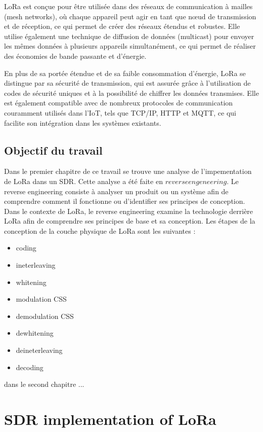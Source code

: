 \documentclass[12pt,a4paper,oneside, titlepage]{report}
\begin{document}
LoRa est conçue pour être utilisée dans des réseaux de communication à mailles (mesh networks), où chaque appareil peut agir en tant que nœud de transmission et de réception, ce qui permet de créer des réseaux étendus et robustes. Elle utilise également une technique de diffusion de données (multicast) pour envoyer les mêmes données à plusieurs appareils simultanément, ce qui permet de réaliser des économies de bande passante et d'énergie.

En plus de sa portée étendue et de sa faible consommation d'énergie, LoRa se distingue par sa sécurité de transmission, qui est assurée grâce à l'utilisation de codes de sécurité uniques et à la possibilité de chiffrer les données transmises. Elle est également compatible avec de nombreux protocoles de communication couramment utilisés dans l'IoT, tels que TCP/IP, HTTP et MQTT, ce qui facilite son intégration dans les systèmes existants.

\section{Objectif du travail}

Dans le premier chapitre de ce travail se trouve une analyse de l'impementation de LoRa dans un SDR. Cette analyse a été faite en $reverse engeneering$. Le reverse engineering consiste à analyser un produit ou un système afin de comprendre comment il fonctionne ou d'identifier ses principes de conception. Dans le contexte de LoRa, le reverse engineering examine la technologie derrière LoRa afin de comprendre ses principes de base et sa conception. Les étapes de la conception de la couche physique de LoRa sont les suivantes :
\begin{itemize}
\item coding
\item ineterleaving
\item whitening
\item modulation CSS
\item demodulation CSS
\item dewhitening
\item deineterleaving
\item decoding
\end{itemize} 

dans le second chapitre ... 


\newpage


\chapter{SDR implementation of LoRa}\label{ch:1}
\renewcommand{\leftmark}{CHAPITRE \thechapter.~~Physical LoRa}
\end{document}
